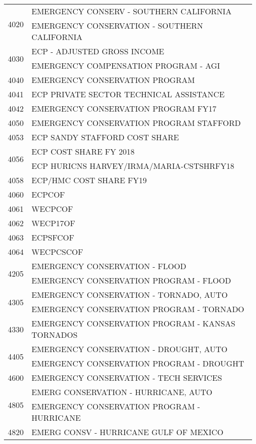 \begin{longtable}{ll}
\cline{1-2}
\multirow[t]{2}{*}{4020} & EMERGENCY CONSERV - SOUTHERN CALIFORNIA \\
 & EMERGENCY CONSERVATION - SOUTHERN CALIFORNIA \\
\cline{1-2}
\multirow[t]{2}{*}{4030} & ECP - ADJUSTED GROSS INCOME \\
 & EMERGENCY COMPENSATION PROGRAM - AGI \\
\cline{1-2}
4040 & EMERGENCY CONSERVATION PROGRAM \\
\cline{1-2}
4041 & ECP PRIVATE SECTOR TECHNICAL ASSISTANCE \\
\cline{1-2}
4042 & EMERGENCY CONSERVATION PROGRAM FY17 \\
\cline{1-2}
4050 & EMERGENCY CONSERVATION PROGRAM STAFFORD \\
\cline{1-2}
4053 & ECP SANDY STAFFORD COST SHARE \\
\cline{1-2}
\multirow[t]{2}{*}{4056} & ECP COST SHARE FY 2018 \\
 & ECP HURICNS HARVEY/IRMA/MARIA-CSTSHRFY18 \\
\cline{1-2}
4058 & ECP/HMC COST SHARE FY19 \\
\cline{1-2}
4060 & ECPCOF \\
\cline{1-2}
4061 & WECPCOF \\
\cline{1-2}
4062 & WECP17OF \\
\cline{1-2}
4063 & ECPSFCOF \\
\cline{1-2}
4064 & WECPCSCOF \\
\cline{1-2}
\multirow[t]{2}{*}{4205} & EMERGENCY CONSERVATION - FLOOD \\
 & EMERGENCY CONSERVATION PROGRAM - FLOOD \\
\cline{1-2}
\multirow[t]{2}{*}{4305} & EMERGENCY CONSERVATION - TORNADO, AUTO \\
 & EMERGENCY CONSERVATION PROGRAM - TORNADO \\
\cline{1-2}
4330 & EMERGENCY CONSERVATION PROGRAM - KANSAS TORNADOS \\
\cline{1-2}
\multirow[t]{2}{*}{4405} & EMERGENCY CONSERVATION - DROUGHT, AUTO \\
 & EMERGENCY CONSERVATION PROGRAM - DROUGHT \\
\cline{1-2}
4600 & EMERGENCY CONSERVATION - TECH SERVICES \\
\cline{1-2}
\multirow[t]{2}{*}{4805} & EMERG CONSERVATION - HURRICANE, AUTO \\
 & EMERGENCY CONSERVATION PROGRAM - HURRICANE \\
\cline{1-2}
\multirow[t]{2}{*}{4820} & EMERG CONSV - HURRICANE GULF OF MEXICO \\

\end{longtable}
